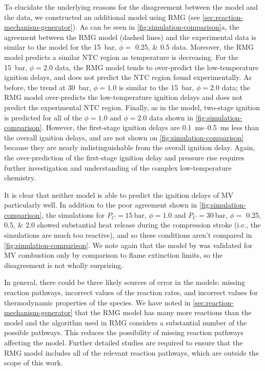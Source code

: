\documentclass[letterpaper, review, sort&compress]{elsarticle}
\begin{document}
To elucidate the underlying reasons for the disagreement between the \citet{Dievart2013} model and
the data, we constructed an additional model using RMG (see
\cref{sec:reaction-mechanism-generator}). As can be seen in \cref{fig:simulation-comparison}a, the
agreement between the RMG model (dashed lines) and the experimental data is similar to the
\citet{Dievart2013} model for the \SI{15}{\bar}, \(\phi =\) \numlist{0.25; 0.5} data. Moreover, the
RMG model predicts a similar NTC region as temperature is decreasing. For the \SI{15}{\bar}, \(\phi =
2.0\) data, the RMG model tends to over-predict the low-temperature ignition delays, and does not
predict the NTC region found experimentally. As before, the trend at \SI{30}{\bar}, \(\phi=1.0\) is
similar to the \SI{15}{\bar}, \(\phi=2.0\) data; the RMG model over-predicts the low-temperature
ignition delays and does not predict the experimental NTC region. Finally, as in the
\citet{Dievart2013} model, two-stage ignition is predicted for all of the \(\phi=1.0\) and
\(\phi=2.0\) data shown in \cref{fig:simulation-comparison}. However, the first-stage ignition
delays are \SIrange{0.1}{0.5}{\ms} less than the overall ignition delays, and are not shown on
\cref{fig:simulation-comparison} because they are nearly indistinguishable from the overall ignition
delay. Again, the over-prediction of the first-stage ignition delay and pressure rise requires
further investigation and understanding of the complex low-temperature chemistry.

It is clear that neither model is able to predict the ignition delays of MV particularly well. In
addition to the poor agreement shown in \cref{fig:simulation-comparison}, the simulations for
\(P_C = \SI{15}{\bar}\), \(\phi=1.0\) and \(P_C = \SI{30}{\bar}\), \(\phi=\) \numlist{0.25;0.5;2.0}
showed substantial heat release during the compression stroke (i.e., the simulations are much too
reactive), and so these conditions aren't compared in \cref{fig:simulation-comparison}. We note
again that the model by \citet{Dievart2013} was validated for MV combustion only by comparison to
flame extinction limits, so the disagreement is not wholly surprising.

In general, there could be three likely sources of error in the models: missing reaction pathways,
incorrect values of the reaction rates, and incorrect values for thermodynamic properties of the
species. We have noted in \cref{sec:reaction-mechanism-generator} that the RMG model has many more
reactions than the \citet{Dievart2013} model and the algorithm used in RMG considers a substantial
number of the possible pathways. This reduces the possibility of missing reaction pathways affecting
the model. Further detailed studies are required to ensure that the RMG model includes all of the
relevant reaction pathways, which are outside the scope of this work.
\end{document}

